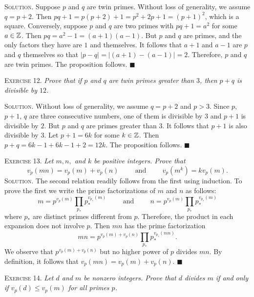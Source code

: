 \documentclass[11pt, leqno]{article}
\newcommand{\done}{\ensuremath{\blacksquare}}
\begin{document}
\textsc{Solution}. Suppose $p$ and $q$ are twin primes. Without loss of generality, we assume $q = p+2$. Then $pq+1 = p(p+2) + 1 = p^2 + 2p + 1 = (p+1)^2$, which is a square. Conversely, suppose $p$ and $q$ are two primes with $pq+1 = a^2$ for some $a\in\mathbb{Z}$. Then $pq = a^2-1 = (a+1)(a-1)$. But $p$ and $q$ are primes, and the only factors they have are $1$ and themselves. It follows that $a+1$ and $a-1$ are $p$ and $q$ themselves so that $|p-q| = |(a+1)-(a-1)| =  2$. Therefore, $p$ and $q$ are twin primes. The proposition follows. \done

\textsc{Exercise 12}. \emph{Prove that if $p$ and $q$ are twin primes greater than $3$, then $p+q$ is divisible by $12$.}

\textsc{Solution}. Without loss of generality, we assume $q = p+2$ and $p>3$. Since $p$, $p+1$, $q$ are three consecutive numbers, one of them is divisible by $3$ and $p+1$ is divisible by $2$. But $p$ and $q$ are primes greater than $3$. It follows that $p+1$ is also divisible by $3$. Let $p+1 = 6k$ for some $k\in\mathbb{Z}$. Then $p+q = 6k - 1 + 6k-1 + 2 = 12k$. The proposition follows. \done

\textsc{Exercise 13}. \emph{Let $m, n,$ and $k$ be positive integers. Prove that 
\begin{displaymath}
v_p(mn) = v_p(m) + v_p(n) \hspace{1cm}\text{and}\hspace{1cm} v_p(m^k) = kv_p(m).
\end{displaymath}}\textsc{Solution}. The second relation readily follows from the first using induction. To prove the first we write the prime factorizations of $m$ and $n$ as follows: 
\begin{displaymath}
m = p^{v_p(m)}\prod_{p_{*}}^{} p_{*}^{v_{p_{*}}(m)} \hspace{1cm}\text{and}\hspace{1cm} n = p^{v_p(m)}\prod_{p_{*}}^{} p_{*}^{v_{p_{*}}(m)}
\end{displaymath}
where $p_{*}$ are distinct primes different from $p$. Therefore, the product in each expansion does not involve $p$. Then $mn$ has the prime factorization 
\begin{displaymath}
mn = p^{v_p(m)+v_p(n)}\prod_{p_{*}}^{}p_{*}^{v_{p_{*}}(mn)}.
\end{displaymath}
We observe that $p^{v_p(m)+v_p(n)}$ but no higher power of $p$ divides $mn$. By definition, it follows that $v_p(mn) = v_p(m) + v_p(n)$. \done

\textsc{Exercise 14}. \emph{Let $d$ and $m$ be nonzero integers. Prove that $d$ divides $m$ if and only if $v_p(d)\leq v_p(m)$ for all primes $p$.}
\end{document}
